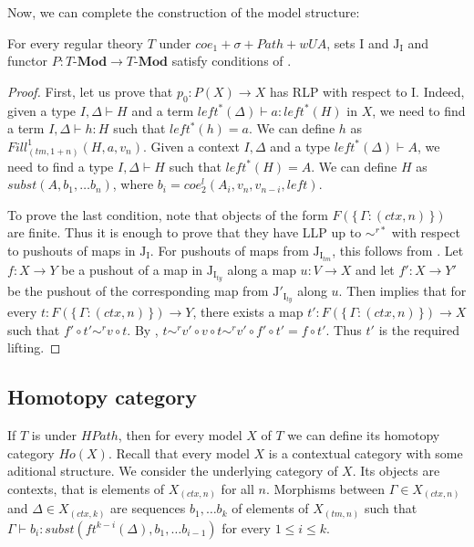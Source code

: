 \documentclass[reqno]{amsart}
\theoremstyle{definition}
\theoremstyle{remark}
\newcommand{\cat}[1]{\mathbf{#1}}
\newcommand{\Mod}[1]{#1\text{-}\cat{Mod}}
\newcommand{\I}{\mathrm{I}}
\newcommand{\J}{\mathrm{J}}
\numberwithin{figure}{section}
\begin{document}
Now, we can complete the construction of the model structure:
\begin{thm}
For every regular theory $T$ under $coe_1 + \sigma + Path + wUA$, sets $\I$ and $\J_\I$ and functor $P : \Mod{T} \to \Mod{T}$ satisfy conditions of .
\end{thm}
\begin{proof}
First, let us prove that $p_0 : P(X) \to X$ has RLP with respect to $\I$.
Indeed, given a type $I, \Delta \vdash H$ and a term $left^*(\Delta) \vdash a : left^*(H)$ in $X$,
we need to find a term $I, \Delta \vdash h : H$ such that $left^*(h) = a$.
We can define $h$ as $Fill^1_{(tm,1+n)}(H, a, v_n)$.
Given a context $I, \Delta$ and a type $left^*(\Delta) \vdash A$,
we need to find a type $I, \Delta \vdash H$ such that $left^*(H) = A$.
We can define $H$ as $subst(A, b_1, \ldots b_n)$, where $b_i = coe^l_2(A_i, v_n, v_{n-i}, left)$.

To prove the last condition, note that objects of the form $F(\{\,\Gamma : (ctx,n)\,\})$ are finite.
Thus it is enough to prove that they have LLP up to $\sim^{r*}$ with respect to pushouts of maps in $\J_\I$.
For pushouts of maps from $\J_{\I_{tm}}$, this follows from .
Let $f : X \to Y$ be a pushout of a map in $\J_{\I_{ty}}$ along a map $u : V \to X$ and let $f' : X \to Y'$ be the pushout of the corresponding map from $\J'_{\I_{ty}}$ along $u$.
Then  implies that for every $t : F(\{\,\Gamma : (ctx,n)\,\}) \to Y$, there exists a map $t' : F(\{\,\Gamma : (ctx,n)\,\}) \to X$ such that $f' \circ t' \sim^r v \circ t$.
By , $t \sim^r v' \circ v \circ t \sim^r v' \circ f' \circ t' = f \circ t'$.
Thus $t'$ is the required lifting.
\end{proof}

\subsection{Homotopy category}

If $T$ is under $HPath$, then for every model $X$ of $T$ we can define its homotopy category $Ho(X)$.
Recall that every model $X$ is a contextual category with some aditional structure.
We consider the underlying category of $X$.
Its objects are contexts, that is elements of $X_{(ctx,n)}$ for all $n$.
Morphisms between $\Gamma \in X_{(ctx,n)}$ and $\Delta \in X_{(ctx,k)}$ are sequences $b_1, \ldots b_k$ of elements of $X_{(tm,n)}$
such that $\Gamma \vdash b_i : subst(ft^{k-i}(\Delta), b_1, \ldots b_{i-1})$ for every $1 \leq i \leq k$.
\end{document}
